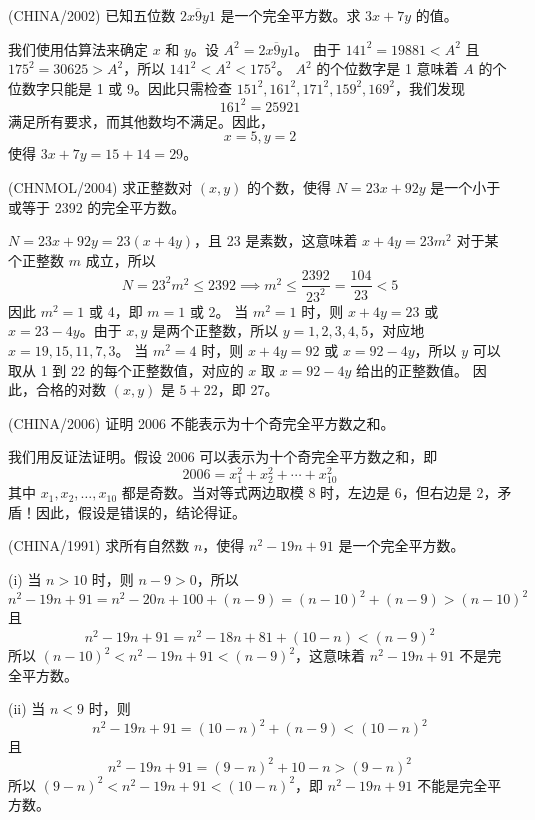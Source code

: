 \begin{questions}
\question (CHINA/2002) 已知五位数 $\overline{2x9y1}$ 是一个完全平方数。求 $3x + 7y$ 的值。

\begin{solution}
我们使用估算法来确定 $x$ 和 $y$。设 $A^2 = \overline{2x9y1}$。
由于 $141^2 = 19881 < A^2$ 且 $175^2 = 30625 > A^2$，所以 $141^2 < A^2 < 175^2$。
$A^2$ 的个位数字是 1 意味着 $A$ 的个位数字只能是 1 或 9。因此只需检查 $151^2, 161^2, 171^2, 159^2, 169^2$，我们发现
\[
161^2 = 25921
\]
满足所有要求，而其他数均不满足。因此，
\[
x = 5, y = 2
\]
使得 $3x + 7y = 15 + 14 = 29$。
\end{solution}

\question (CHNMOL/2004) 求正整数对 $(x, y)$ 的个数，使得 $N = 23x + 92y$ 是一个小于或等于 2392 的完全平方数。

\begin{solution}
$N = 23x + 92y = 23(x + 4y)$，且 23 是素数，这意味着 $x + 4y = 23m^2$ 对于某个正整数 $m$ 成立，所以
\[
N = 23^2 m^2 \le 2392 \implies m^2 \le \frac{2392}{23^2} = \frac{104}{23} < 5
\]
因此 $m^2 = 1$ 或 4，即 $m = 1$ 或 2。
当 $m^2 = 1$ 时，则 $x + 4y = 23$ 或 $x = 23 - 4y$。由于 $x, y$ 是两个正整数，所以 $y = 1, 2, 3, 4, 5$，对应地 $x = 19, 15, 11, 7, 3$。
当 $m^2 = 4$ 时，则 $x + 4y = 92$ 或 $x = 92 - 4y$，所以 $y$ 可以取从 1 到 22 的每个正整数值，对应的 $x$ 取 $x = 92 - 4y$ 给出的正整数值。
因此，合格的对数 $(x, y)$ 是 $5 + 22$，即 27。
\end{solution}

\question (CHINA/2006) 证明 2006 不能表示为十个奇完全平方数之和。

\begin{solution}
我们用反证法证明。假设 2006 可以表示为十个奇完全平方数之和，即
\[
2006 = x_1^2 + x_2^2 + \cdots + x_{10}^2
\]
其中 $x_1, x_2, \dots, x_{10}$ 都是奇数。当对等式两边取模 8 时，左边是 6，但右边是 2，矛盾！因此，假设是错误的，结论得证。
\end{solution}

\question (CHINA/1991) 求所有自然数 $n$，使得 $n^2 - 19n + 91$ 是一个完全平方数。

\begin{solution}
(i) 当 $n > 10$ 时，则 $n - 9 > 0$，所以
\[
n^2 - 19n + 91 = n^2 - 20n + 100 + (n - 9) = (n - 10)^2 + (n - 9) > (n - 10)^2
\]
且
\[
n^2 - 19n + 91 = n^2 - 18n + 81 + (10 - n) < (n - 9)^2
\]
所以 $(n - 10)^2 < n^2 - 19n + 91 < (n - 9)^2$，这意味着 $n^2 - 19n + 91$ 不是完全平方数。

(ii) 当 $n < 9$ 时，则
\[
n^2 - 19n + 91 = (10 - n)^2 + (n - 9) < (10 - n)^2
\]
且
\[
n^2 - 19n + 91 = (9 - n)^2 + 10 - n > (9 - n)^2
\]
所以 $(9 - n)^2 < n^2 - 19n + 91 < (10 - n)^2$，即 $n^2 - 19n + 91$ 不能是完全平方数。


\end{solution}
\end{questions}

